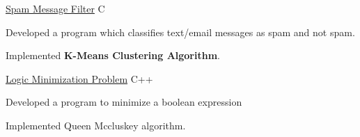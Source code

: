 \begin{cventries}
 


  \projects
   {} %
    {\href{}{Spam Message Filter}} %
    {C} %
    {} %
    {
      \begin{cvitems} %
        \item {Developed a program which classifies text/email messages as spam and not spam.}
        \item {Implemented \textbf{K-Means Clustering Algorithm}.}
      \end{cvitems}
    }


  \projects
    {} %
    {\href{}{Logic Minimization Problem}} %
    {C++} %
    {} %
    {
      \begin{cvitems} %
        \item {Developed a program to minimize a boolean expression}
        \item {Implemented Queen Mccluskey algorithm.}
      \end{cvitems}
    }


\end{cventries}
